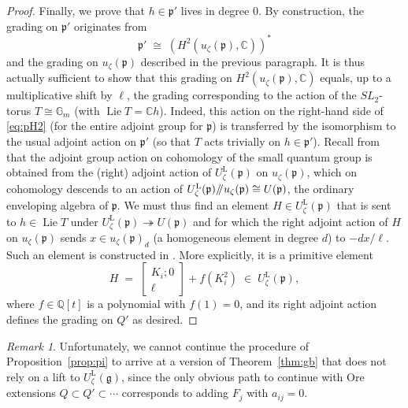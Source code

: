 \documentclass{amsart}
\numberwithin{equation}{section}
\theoremstyle{definition}
\theoremstyle{remark}
\newtheorem{remark}[subsubsection]{Remark}
\newcommand{\mG}{\mathbb{G}}
\newcommand{\tto}{\twoheadrightarrow}
\newcommand{\ffp}{\mathfrak{p}}
\newcommand{\fg}{\mathfrak{g}}
\newcommand{\mC}{\mathbb{C}}
\renewcommand{\L}{\mathrm{L}}
\begin{document}
\begin{proof}
Finally, we prove that $h\in\ffp'$ lives in degree $0$. By construction, the grading on $\ffp'$ originates from
\begin{equation}\label{eq:pH2}\ffp'\;\cong\; \left(H^2(u_\zeta(\ffp),\mC)\right)^\ast\end{equation}
and the grading on $u_\zeta(\ffp)$ described in the previous paragraph. It is thus actually sufficient to show that this grading on $H^2(u_\zeta(\ffp),\mC)$ equals, up to a multiplicative shift by $\ell$, the grading corresponding to the action of the $SL_2$-torus $T\cong \mG_m$ (with $\operatorname{Lie}T=\mC h$).
Indeed, this action on the right-hand side of \eqref{eq:pH2} (for the entire adjoint group for $\ffp$) is transferred by the isomorphism to the usual adjoint action on $\ffp'$ (so that $T$ acts trivially on $h\in\ffp'$). Recall from \cite[Chapter~2]{Dr1} that the adjoint group action on cohomology of the small quantum group is obtained from the (right) adjoint action of $U^{\L}_\zeta(\ffp)$ on $u_\zeta(\ffp)$, which on cohomology descends to an action of $U^{\L}_\zeta(\ffp)/\hspace{-1mm}/u_\zeta(\ffp)\cong U(\ffp)$, the ordinary enveloping algebra of $\ffp$. We must thus find an element $H\in U^{\L}_\zeta(\ffp)$ that is sent to $h\in\operatorname{Lie} T$ under $U^{\L}_\zeta(\ffp)\tto U(\ffp)$ and for which the right adjoint action of $H$ on $u_\zeta(\ffp)$ sends $x\in u_\zeta(\ffp)_{d}$ (a homogeneous element in degree $d$) to $- d x/\ell$. Such an element is constructed in \cite[Theorem~3.1(d)]{Le}. More explicitly, it is a primitive element
\[H\;=\;\left[\begin{smallmatrix} K_i;0 \\ \ell \end{smallmatrix}\right]+f(K_i^2)\;\in\; U^{\L}_\zeta(\ffp),\]
where $f\in\mathbb{Q}[t]$ is a polynomial with $f(1)=0$, and its right adjoint action defines the grading on $Q'$ as desired.
\end{proof}
 
 
 \begin{remark}
 Unfortunately, we cannot continue the procedure of Proposition~\ref{prop:pi} to arrive at a version of Theorem~\ref{thm:gb} that does not rely on a lift to $U^{\L}_\zeta(\fg)$, since the only obvious path to continue with Ore extensions $Q\subset Q'\subset\cdots$ corresponds to adding $F_j$ with $a_{ij}=0$.
 \end{remark}
 
\end{document}
